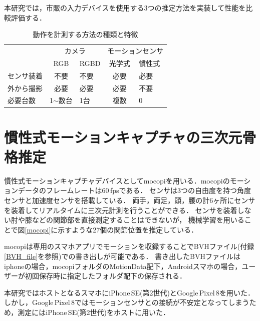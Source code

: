 \documentclass[a4j, fleqn, 12pt]{jsreport}
\begin{document}
本研究では，市販の入力デバイスを使用する3つの推定方法を実装して性能を比較評価する．
\begin{table}[b!]
  \centering
  \caption{動作を計測する方法の種類と特徴}
  \begin{tabular}{l|ll|ll}
    \hline
                  & \multicolumn{2}{c|}{\small{カメラ}}       & \multicolumn{2}{c}{\small{モーションセンサ}}                                                  \\ \cline{2-5}
                  & \multicolumn{1}{c|}{\small{RGB}}       & \small{RGBD}                         & \multicolumn{1}{c|}{\small{光学式}} & \small{慣性式} \\ \hline
    \small{センサ装着} & \multicolumn{1}{c|}{\small{不要}}        & \small{不要}                           & \multicolumn{1}{c|}{\small{必要}}  & \small{必要}  \\
    \small{外から撮影} & \multicolumn{1}{c|}{\small{必要}}        & \small{必要}                           & \multicolumn{1}{c|}{\small{必要}}  & \small{不要}  \\
    \small{必要台数}  & \multicolumn{1}{c|}{\small{1$\sim$数台}} & \small{1台}                           & \multicolumn{1}{c|}{\small{複数}}  & \small{0}   \\ \hline
  \end{tabular}
  \label{3D_1}
\end{table}
\section{慣性式モーションキャプチャの三次元骨格推定}\label{motion}
慣性式モーションキャプチャデバイスとしてmocopi\cite{mocopi}を用いる．mocopiのモーションデータのフレームレートは60\,fpsである．
センサは3つの自由度を持つ角度センサと加速度センサを搭載している．
両手，両足，頭，腰の計6ヶ所にセンサを装着してリアルタイムに三次元計測を行うことができる．
センサを装着しない肘や膝などの関節部を直接測定することはできないが，
機械学習を用いることで図\ref{mocopi}に示すような27個の関節位置を推定している．

mocopiは専用のスマホアプリでモーションを収録することでBVHファイル(付録\ref{BVH_file}を参照)での書き出しが可能である．
書き出したBVHファイルはiphoneの場合，mocopiフォルダのMotionData配下，Androidスマホの場合，ユーザーが初回保存時に指定したフォルダ配下の保存される．

本研究ではホストとなるスマホにiPhone\,SE(第2世代)とGoogle\,Pixel\,8を用いた．
しかし，Google\,Pixel\,8ではモーションセンサとの接続が不安定となってしまうため，測定にはiPhone\,SE(第2世代)をホストに用いた．
\end{document}

